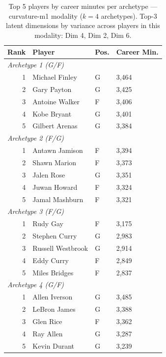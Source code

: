 \begin{table}[htbp]
  \centering\small
  \begin{tabular}{rlll}
    \toprule
    Rank & Player & Pos. & Career Min. \\
    \midrule
    \multicolumn{4}{l}{\textit{Archetype 1 (G/F)}} \\
    \midrule
    1 & Michael Finley & G & 3,464 \\
    2 & Gary Payton & G & 3,425 \\
    3 & Antoine Walker & F & 3,406 \\
    4 & Kobe Bryant & G & 3,401 \\
    5 & Gilbert Arenas & G & 3,384 \\
    \midrule[0.4pt]
    \multicolumn{4}{l}{\textit{Archetype 2 (F/G)}} \\
    \midrule
    1 & Antawn Jamison & F & 3,394 \\
    2 & Shawn Marion & F & 3,373 \\
    3 & Jalen Rose & G & 3,351 \\
    4 & Juwan Howard & F & 3,324 \\
    5 & Jamal Mashburn & F & 3,321 \\
    \midrule[0.4pt]
    \multicolumn{4}{l}{\textit{Archetype 3 (F/G)}} \\
    \midrule
    1 & Rudy Gay & F & 3,175 \\
    2 & Stephen Curry & G & 2,983 \\
    3 & Russell Westbrook & G & 2,914 \\
    4 & Eddy Curry & F & 2,849 \\
    5 & Miles Bridges & F & 2,837 \\
    \midrule[0.4pt]
    \multicolumn{4}{l}{\textit{Archetype 4 (G/F)}} \\
    \midrule
    1 & Allen Iverson & G & 3,485 \\
    2 & LeBron James & G & 3,388 \\
    3 & Glen Rice & F & 3,362 \\
    4 & Ray Allen & G & 3,287 \\
    5 & Kevin Durant & G & 3,239 \\
    \bottomrule
  \end{tabular}
  \caption{Top 5 players by career minutes per archetype --- curvature-m1 modality ($k=4$ archetypes). Top-3 latent dimensions by variance across players in this modality: Dim 4, Dim 2, Dim 6.}
  \label{tab:arch_reps_curvature_m1}
\end{table}

